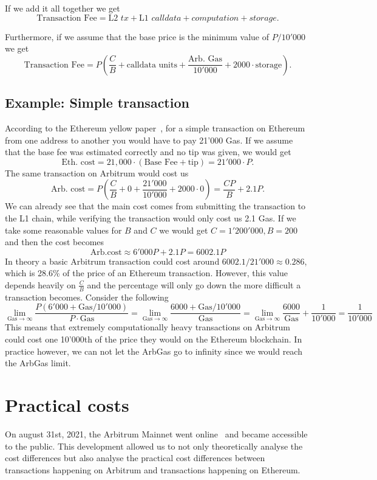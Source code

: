 \documentclass[a4paper,oneside,openright,11pt]{report}
\begin{document}
If we add it all together we get
\[
	\text{Transaction Fee} = \text{L2 } \textit{tx} + \text{L1 } \textit{calldata} + \textit{computation} + \textit{storage}.
\]

Furthermore, if we assume that the base price is the minimum value of $P/10'000$ we get
\[
	\text{Transaction Fee} = P(\frac{C}{B} + \text{calldata units} + \frac{\text{Arb. Gas}}{10'000} + 2000 \cdot \text{storage}).
\]

\subsection{Example: Simple transaction}
	According to the Ethereum yellow paper~\cite{wood2014ethereum},
	for a simple transaction on Ethereum from one address to another you would have to pay 21'000 Gas.
	If we assume that the base fee was estimated correctly and no tip was given, we would get
	\[
		\text{Eth. cost} = 21,000 \cdot (\text{Base Fee} + \text{tip}) = 21'000 \cdot P.
	\]
	The same transaction on Arbitrum would cost us
	\[
		\text{Arb. cost} = P(\frac{C}{B} + 0 + \frac{21'000}{10'000} + 2000 \cdot 0) = \frac{CP}{B} + 2.1P.
	\]
	We can already see that the main cost comes from submitting the transaction to the L1 chain, while verifying the
	transaction would only cost us 2.1 Gas.
	If we take some reasonable values for $B$ and $C$ we would get $C = 1'200'000, B = 200$ 
	and then the cost becomes
	\[
		\text{Arb.cost} \approx 6'000 P + 2.1 P = 6002.1 P 
	\]
	In theory a basic Arbitrum transaction could cost around $6002.1/21'000 \approx 0.286$, 
	which is 28.6\% of the price of an Ethereum transaction. However, this value depends 
	heavily on $\frac{C}{B}$ and the percentage will only go down the more difficult 
	a transaction becomes. Consider the following
	\[
		\lim_{\text{Gas} \to \infty} \frac{P(6'000 + \text{Gas}/10'000)}{P \cdot \text{Gas}} = 
		\lim_{\text{Gas} \to \infty} \frac{6000 + \text{Gas}/10'000}{\text{Gas}} =
		\lim_{\text{Gas} \to \infty} \frac{6000}{\text{Gas}} + \frac{1}{10'000} =
		\frac{1}{10'000}
	\]
	This means that extremely computationally heavy transactions on Arbitrum could cost one 
	10'000th of the price they would on the Ethereum blockchain. In practice however, we can not
	let the ArbGas go to infinity since we would reach the ArbGas limit.
	
\section{Practical costs}
On august 31st, 2021, the Arbitrum Mainnet went online~\cite{ArbMainNet} 
and became accessible to the public. This development allowed us to not only theoretically 
analyse the cost differences but also analyse the practical cost differences between 
transactions happening on Arbitrum and transactions happening on Ethereum.
\end{document}
